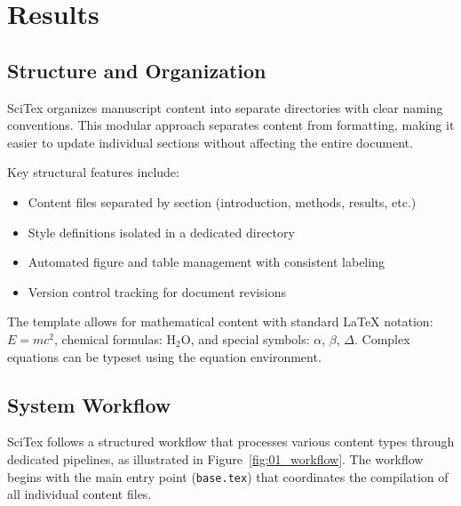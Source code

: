 
\section{Results}
\label{sec:results}


\subsection{Structure and Organization}
\label{subsec:structure}

SciTex organizes manuscript content into separate directories with clear naming conventions. This modular approach separates content from formatting, making it easier to update individual sections without affecting the entire document.


Key structural features include:

\begin{itemize}
    \item Content files separated by section (introduction, methods, results, etc.)
    \item Style definitions isolated in a dedicated directory
    \item Automated figure and table management with consistent labeling
    \item Version control tracking for document revisions
\end{itemize}


The template allows for mathematical content with standard LaTeX notation: $E = mc^2$, chemical formulas: H$_2$O, and special symbols: $\alpha$, $\beta$, $\Delta$. Complex equations can be typeset using the equation environment.

\subsection{System Workflow}
\label{subsec:workflow}

SciTex follows a structured workflow that processes various content types through dedicated pipelines, as illustrated in Figure~\ref{fig:01_workflow}. The workflow begins with the main entry point (\verb|base.tex|) that coordinates the compilation of all individual content files.

